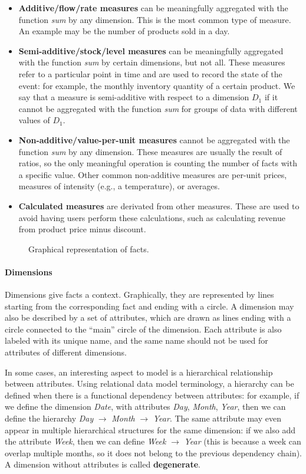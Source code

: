 \begin{itemize}
    \item \textbf{Additive/flow/rate measures} can be meaningfully aggregated with the function \textit{sum} by any dimension. This is the most common type of measure. An example may be the number of products sold in a day.
    \item \textbf{Semi-additive/stock/level measures} can be meaningfully aggregated with the function \textit{sum} by certain dimensions, but not all. These measures refer to a particular point in time and are used to record the state of the event: for example, the monthly inventory quantity of a certain product. We say that a measure is semi-additive with respect to a dimension $D_1$ if it cannot be aggregated with the function \textit{sum} for groups of data with different values of $D_1$.
    \item \textbf{Non-additive/value-per-unit measures} cannot be aggregated with the function \textit{sum} by any dimension. These measures are usually the result of ratios, so the only meaningful operation is counting the number of facts with a specific value. Other common non-additive measures are per-unit prices, measures of intensity (e.g., a temperature), or averages.
    \item \textbf{Calculated measures} are derivated from other measures. These are used to avoid having users perform these calculations, such as calculating revenue from product price minus discount. 
\end{itemize}

\begin{figure}[ht]
    \centering
    
    \caption{Graphical representation of facts.}
\end{figure}

\paragraph{Dimensions} Dimensions give facts a context. Graphically, they are represented by lines starting from the corresponding fact and ending with a circle. A dimension may also be described by a set of attributes, which are drawn as lines ending with a circle connected to the ``main'' circle of the dimension. Each attribute is also labeled with its unique name, and the same name should not be used for attributes of different dimensions.

In some cases, an interesting aspect to model is a hierarchical relationship between attributes. Using relational data model terminology, a hierarchy can be defined when there is a functional dependency between attributes: for example, if we define the dimension \textit{Date}, with attributes \textit{Day}, \textit{Month}, \textit{Year}, then we can define the hierarchy \textit{Day} $\rightarrow$ \textit{Month} $\rightarrow$ \textit{Year}. The same attribute may even appear in multiple hierarchical structures for the same dimension: if we also add the attribute \textit{Week}, then we can define \textit{Week} $\rightarrow$ \textit{Year} (this is because a week can overlap multiple months, so it does not belong to the previous dependency chain). A dimension without attributes is called \textbf{degenerate}.

